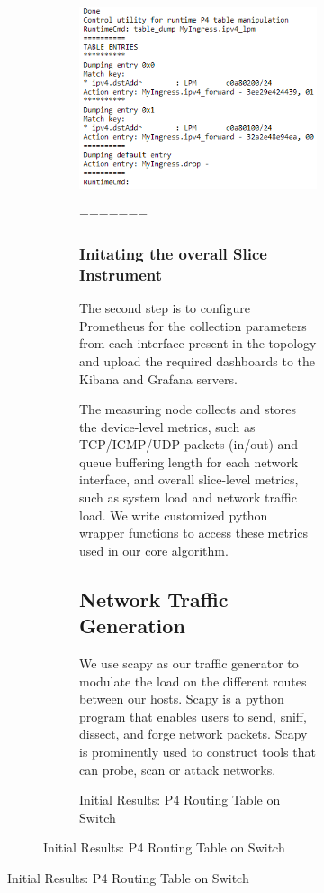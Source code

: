 \documentclass[conference]{IEEEtran}
\begin{document}
\begin{figure}[h!]
\begin{figure}[b]
    \begin{figure}[t]
        \includegraphics[scale=0.5]{Switch_Routing_Table.png}
        \centering
        \caption{Initial Results: P4 Routing Table on Switch}
=======
    \subsubsection{Initating the overall Slice Instrument} The second step is to configure Prometheus for the collection parameters from each interface present in the topology and upload the required dashboards to the Kibana and Grafana servers.


    The measuring node collects and stores the device-level metrics, such as TCP/ICMP/UDP packets (in/out) and queue buffering length for each network interface, and overall slice-level metrics, such as system load and network traffic load. We write customized python wrapper functions to access these metrics used in our core algorithm.

    \subsection{Network Traffic Generation}
    We use scapy as our traffic generator to modulate the load on the different routes between our hosts. Scapy is a python program that enables users to send, sniff, dissect, and forge network packets. Scapy is prominently used to construct tools that can probe, scan or attack networks.


\end{figure}
\end{figure}
\end{figure}
\end{document}
